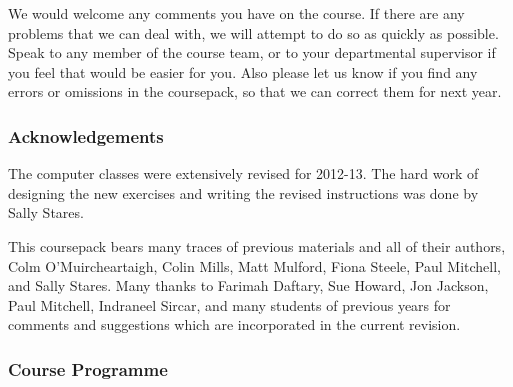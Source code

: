 \vspace*{-2ex}
We would welcome any comments you have on the course.  If there are any
problems that we can deal with, we will attempt to do so as quickly as
possible.  Speak to any member of the course team, or to your
departmental supervisor if you feel that would be easier for you.
Also please let us know if you find any errors or omissions in the
coursepack, so that we can correct them for next year.


\vspace*{-1ex}
\subsubsection{Acknowledgements}

\vspace*{-2ex}
The computer classes were extensively revised for 2012-13. The hard work
of designing the new exercises and writing the revised instructions was
done by Sally Stares.

This coursepack bears many traces of previous materials and all of their
authors, Colm O'Muircheartaigh, Colin Mills, Matt Mulford, Fiona Steele,
Paul Mitchell, and Sally Stares. Many thanks to Farimah Daftary, Sue
Howard, Jon Jackson, Paul Mitchell, Indraneel Sircar, and many students
of previous years for comments and suggestions which are incorporated in
the current revision.


\newpage
\subsubsection{Course Programme}

